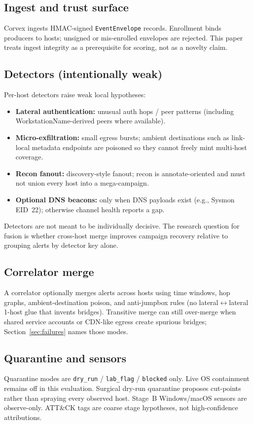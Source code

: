 \documentclass[conference,compsoc]{IEEEtran}
\begin{document}
\subsection{Ingest and trust surface}
Corvex ingests HMAC-signed \texttt{EventEnvelope} records.
Enrollment binds producers to hosts; unsigned or mis-enrolled envelopes are
rejected.
This paper treats ingest integrity as a prerequisite for scoring, not as a
novelty claim.

\subsection{Detectors (intentionally weak)}
Per-host detectors raise weak local hypotheses:
\begin{itemize}
\item \textbf{Lateral authentication:} unusual auth hops / peer patterns
(including WorkstationName-derived peers where available).
\item \textbf{Micro-exfiltration:} small egress bursts; ambient destinations
such as link-local metadata endpoints are poisoned so they cannot freely mint
multi-host coverage.
\item \textbf{Recon fanout:} discovery-style fanout; recon is annotate-oriented
and must not union every host into a mega-campaign.
\item \textbf{Optional DNS beacons:} only when DNS payloads exist (e.g., Sysmon
EID~22); otherwise channel health reports a gap.
\end{itemize}
Detectors are not meant to be individually decisive.
The research question for fusion is whether cross-host merge improves campaign
recovery relative to grouping alerts by detector key alone.

\subsection{Correlator merge}
A correlator optionally merges alerts across hosts using time windows, hop
graphs, ambient-destination poison, and anti-jumpbox rules (no lateral$\leftrightarrow$lateral
1-host glue that invents bridges).
Transitive merge can still over-merge when shared service accounts or CDN-like
egress create spurious bridges; Section~\ref{sec:failures} names those modes.

\subsection{Quarantine and sensors}
Quarantine modes are \texttt{dry\_run} / \texttt{lab\_flag} / \texttt{blocked}
only.
Live OS containment remains off in this evaluation.
Surgical dry-run quarantine proposes cut-points rather than spraying every
observed host.
Stage~B Windows/macOS sensors are observe-only.
ATT\&CK tags are coarse stage hypotheses, not high-confidence attributions.
\end{document}
